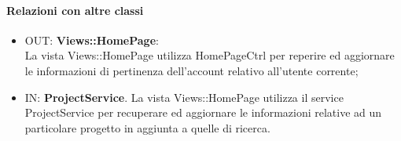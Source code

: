 	\paragraph{Relazioni con altre classi}
	\begin{itemize}
	  \item OUT: \textbf{Views::HomePage}:\\
		La vista Views::HomePage utilizza HomePageCtrl per reperire ed aggiornare le informazioni di pertinenza dell'account relativo all'utente corrente;	
	   \item IN: \textbf{ProjectService}.
	  	La vista Views::HomePage utilizza il service ProjectService per recuperare ed aggiornare le informazioni relative ad un particolare progetto in aggiunta a quelle di ricerca.	
	\end{itemize}